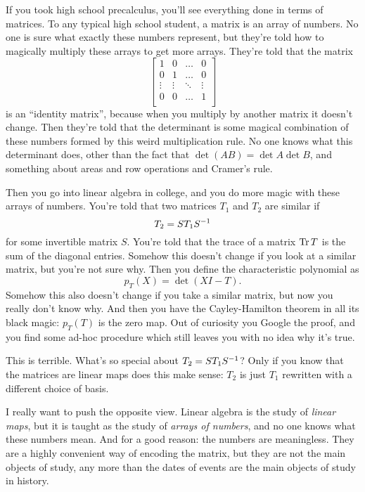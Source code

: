 If you took high school precalculus, you'll see everything done in terms of matrices.
To any typical high school student, a matrix is an array of numbers.
No one is sure what exactly these numbers represent,
but they're told how to magically multiply these arrays to get more arrays. 
They're told that the matrix
\[ \begin{bmatrix}
		1 & 0 & \dots & 0 \\
		0 & 1 & \dots & 0 \\
		\vdots & \vdots & \ddots & \vdots \\
		0 & 0 & \dots & 1 \\
	\end{bmatrix} \]
is an ``identity matrix'', because when you multiply
by another matrix it doesn't change.
Then they're told that the determinant is some magical combination of these
numbers formed by this weird multiplication rule.
No one knows what this determinant does,
other than the fact that $\det(AB) = \det A \det B$,
and something about areas and row operations and Cramer's rule.

Then you go into linear algebra in college, and you do more magic
with these arrays of numbers.
You're told that two matrices $T_1$ and $T_2$ are similar if
\[ T_2 = ST_1S^{-1} \] for some invertible matrix $S$.
You're told that the trace of a matrix $\operatorname{Tr} T$ is the sum of the diagonal entries.
Somehow this doesn't change if you look at a similar matrix,
but you're not sure why.
Then you define the characteristic polynomial as
\[ p_T(X) = \det (XI - T). \]
Somehow this also doesn't change if you take a similar matrix,
but now you really don't know why.
And then you have the Cayley-Hamilton theorem in all its black magic:
$p_T(T)$ is the zero map.  Out of curiosity you Google the proof,
and you find some ad-hoc procedure which still leaves you
with no idea why it's true.

This is terrible. What's so special about $T_2 = ST_1S^{-1}$?
Only if you know that the matrices are linear maps does this make sense:
$T_2$ is just $T_1$ rewritten with a different choice of basis.

I really want to push the opposite view.
Linear algebra is the study of \emph{linear maps},
but it is taught as the study of \emph{arrays of numbers},
and no one knows what these numbers mean.
And for a good reason: the numbers are meaningless.
They are a highly convenient way of encoding the matrix,
but they are not the main objects of study,
any more than the dates of events are the main objects of study in history.

